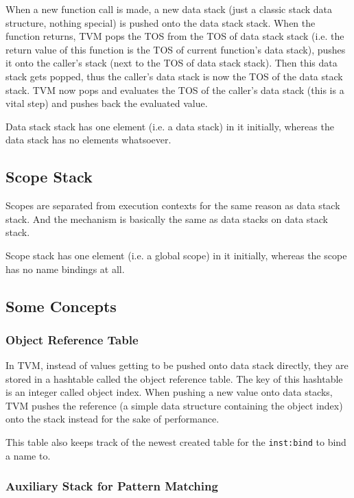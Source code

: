 \documentclass{article}
\newcommand{\inst}[1] {\texttt{inst:#1}}
\begin{document}
When a new function call is made, a new data stack (just a classic stack data structure, nothing special) is pushed onto the data stack stack. When the function returns, TVM pops the TOS from the TOS of data stack stack (i.e. the return value of this function is the TOS of current function's data stack), pushes it onto the caller's stack (next to the TOS of data stack stack). Then this data stack gets popped, thus the caller's data stack is now the TOS of the data stack stack. TVM now pops and evaluates the TOS of the caller's data stack (this is a vital step) and pushes back the evaluated value.

Data stack stack has one element (i.e. a data stack) in it initially, whereas the data stack has no elements whatsoever.

\subsection{Scope Stack}

Scopes are separated from execution contexts for the same reason as data stack stack. And the mechanism is basically the same as data stacks on data stack stack.

Scope stack has one element (i.e. a global scope) in it initially, whereas the scope has no name bindings at all.

\subsection{Some Concepts}

\subsubsection{Object Reference Table}

In TVM, instead of values getting to be pushed onto data stack directly, they are stored in a hashtable called the object reference table. The key of this hashtable is an integer called object index. When pushing a new value onto data stacks, TVM pushes the reference (a simple data structure containing the object index) onto the stack instead for the sake of performance.

This table also keeps track of the newest created table for the \inst{bind} to bind a name to.

\subsubsection{Auxiliary Stack for Pattern Matching}
\end{document}
